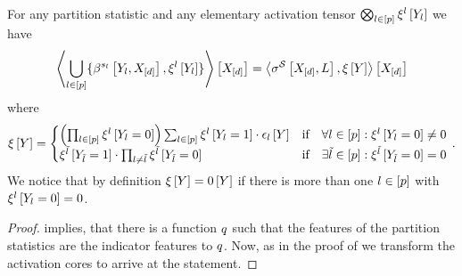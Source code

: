 \begin{theorem}
    \label{the:selectionRepresentationPartitionStatistics}
    For any partition statistic and any elementary activation tensor $\bigotimes_{l\in[p]}\xi^{l}\left[Y_{l}\right]$ we have
    \begin{align*}
        \left\langle \bigcup_{l\in[p]}\{\beta^{s_{l}}\left[Y_{l},X_{[d]}\right],\xi^{l}\left[Y_{l}\right]\}\right\rangle \left[ X_{[d]} \right]
        = \left\langle \sigma^{\mathcal{S}}\left[X_{[d]},L\right],\xi\left[Y\right]\right\rangle \left[ X_{[d]} \right]
    \end{align*}
    where
    \begin{align*}
        \acttensorat{\headvariable}
        =
        \begin{cases}
            \left(\prod_{\selindexin} \acttensorofat{\selindex}{\headvariableof{\selindex}=0} \right) \sum_{\selindexin}\acttensorofat{\selindex}{\headvariableof{\selindex}=1} \cdot \onehotmapofat{\selindex}{\headvariable}
            & \ifspace \uniquantwrtof{\selindexin}{\acttensorofat{\selindex}{\headvariableof{\selindex}=0}\neq 0} \\ %
            \acttensorofat{\secselindex}{\headvariableof{\secselindex}=1} \cdot \prod_{\selindex\neq\secselindex}\acttensorofat{\secselindex}{\headvariableof{\secselindex}=0}
            & \ifspace \existquantwrtof{\secselindex\in[\seldim]}{\acttensorofat{\secselindex}{\headvariableof{\secselindex}=0}=0} %
        \end{cases} \, .
    \end{align*}
    We notice that by definition $\xi\left[Y\right]=0\left[Y\right]$ if there is more than one $l\in[p]$ with $\xi^{l}\left[Y_{l}=0\right]=0$.
\end{theorem}
\begin{proof}
     implies, that there is a function $q$ such that the features of the partition statistics are the indicator features to $q$.
    Now, as in the proof of  we transform the activation cores to arrive at the statement.
\end{proof}

